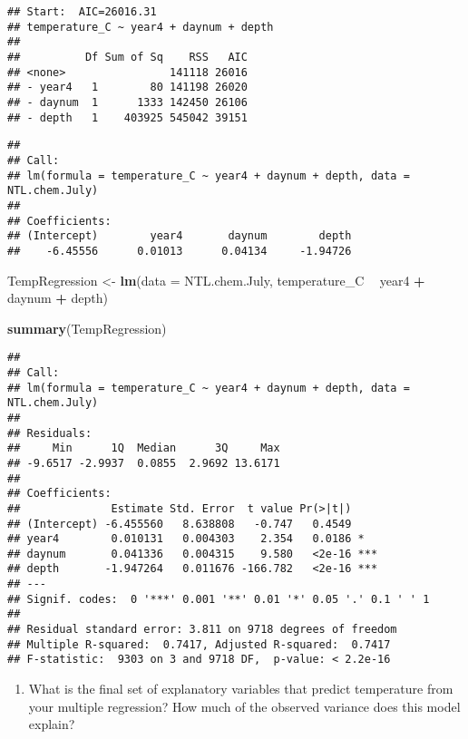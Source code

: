 \documentclass[]{article}
\newenvironment{Shaded}{\begin{snugshade}}{\end{snugshade}}
\newcommand{\DataTypeTok}[1]{\textcolor[rgb]{0.13,0.29,0.53}{#1}}
\newcommand{\KeywordTok}[1]{\textcolor[rgb]{0.13,0.29,0.53}{\textbf{#1}}}
\newcommand{\NormalTok}[1]{#1}
\newcommand{\OperatorTok}[1]{\textcolor[rgb]{0.81,0.36,0.00}{\textbf{#1}}}
\newcommand{\StringTok}[1]{\textcolor[rgb]{0.31,0.60,0.02}{#1}}
\providecommand{\tightlist}{%
  \setlength{\itemsep}{0pt}\setlength{\parskip}{0pt}}
\begin{document}
\begin{verbatim}
## Start:  AIC=26016.31
## temperature_C ~ year4 + daynum + depth
## 
##          Df Sum of Sq    RSS   AIC
## <none>                141118 26016
## - year4   1        80 141198 26020
## - daynum  1      1333 142450 26106
## - depth   1    403925 545042 39151
\end{verbatim}

\begin{verbatim}
## 
## Call:
## lm(formula = temperature_C ~ year4 + daynum + depth, data = NTL.chem.July)
## 
## Coefficients:
## (Intercept)        year4       daynum        depth  
##    -6.45556      0.01013      0.04134     -1.94726
\end{verbatim}

\begin{Shaded}
\begin{Highlighting}[]
\NormalTok{TempRegression <-}\StringTok{ }\KeywordTok{lm}\NormalTok{(}\DataTypeTok{data =}\NormalTok{ NTL.chem.July, }
\NormalTok{                     temperature_C }\OperatorTok{~}\StringTok{ }\NormalTok{year4 }\OperatorTok{+}\StringTok{ }\NormalTok{daynum }\OperatorTok{+}\StringTok{ }\NormalTok{depth)}

\KeywordTok{summary}\NormalTok{(TempRegression)}
\end{Highlighting}
\end{Shaded}

\begin{verbatim}
## 
## Call:
## lm(formula = temperature_C ~ year4 + daynum + depth, data = NTL.chem.July)
## 
## Residuals:
##     Min      1Q  Median      3Q     Max 
## -9.6517 -2.9937  0.0855  2.9692 13.6171 
## 
## Coefficients:
##              Estimate Std. Error  t value Pr(>|t|)    
## (Intercept) -6.455560   8.638808   -0.747   0.4549    
## year4        0.010131   0.004303    2.354   0.0186 *  
## daynum       0.041336   0.004315    9.580   <2e-16 ***
## depth       -1.947264   0.011676 -166.782   <2e-16 ***
## ---
## Signif. codes:  0 '***' 0.001 '**' 0.01 '*' 0.05 '.' 0.1 ' ' 1
## 
## Residual standard error: 3.811 on 9718 degrees of freedom
## Multiple R-squared:  0.7417, Adjusted R-squared:  0.7417 
## F-statistic:  9303 on 3 and 9718 DF,  p-value: < 2.2e-16
\end{verbatim}

\begin{enumerate}
\def\labelenumi{\arabic{enumi}.}
\setcounter{enumi}{4}
\tightlist
\item
  What is the final set of explanatory variables that predict
  temperature from your multiple regression? How much of the observed
  variance does this model explain?
\end{enumerate}
\end{document}
